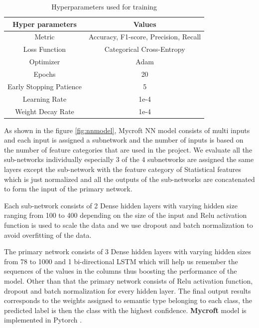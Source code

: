 \documentclass[12pt, a4paper]{report}
\theoremstyle{definition}
\numberwithin{equation}{chapter}
\numberwithin{figure}{chapter}
\numberwithin{table}{chapter}
\begin{document}
\begin{spacing}{1.5}
\begin{table}[H]
\centering
\begin{tabular}{|c| c|} 
\hline
\textbf{Hyper parameters} & \textbf{Values} \\
\hline
Metric & Accuracy, F1-score, Precision, Recall\\ 
Loss Function & Categorical Cross-Entropy\\ 
Optimizer & Adam\\ 
Epochs & 20\\ 
Early Stopping Patience & 5\\ 
Learning Rate & 1e-4\\ 
Weight Decay Rate & 1e-4\\ 
\hline
\end{tabular}
\caption{Hyperparameters used for training}
\label{table:2}
\end{table}

\setlength{\parindent}{0em}
As shown in the figure \ref{fig:nnmodel}, Mycroft NN model consists of multi inputs and each input is assigned a subnetwork and the number of inputs is based on the number of feature categories that are used in the project. We evaluate all the sub-networks individually especially 3 of the 4 subnetworks are assigned the same layers except the sub-network with the feature category of Statistical features which is just normalized and all the outputs of the sub-networks are concatenated to form the input of the primary network.
\par
\setlength{\parskip}{2.2em}
\setlength{\parindent}{0em}
Each sub-network consists of 2 Dense hidden layers with varying hidden size ranging from 100 to 400 depending on the size of the input and Relu activation function is used to scale the data and we use dropout and batch normalization to avoid overfitting of the data.
\par
\setlength{\parskip}{2.2em}
\setlength{\parindent}{0em}
The primary network consists of 3 Dense hidden layers with varying hidden sizes from 78 to 1000 and 1 bi-directional LSTM \cite{lstm} which will help us remember the sequences of the values in the columns thus boosting the performance of the model. Other than that the primary network consists of Relu activation function, dropout and batch normalization for every hidden layer. The final output results corresponds to the weights assigned to semantic type belonging to each class, the predicted label is then the class with the highest confidence. \textbf{Mycroft} model is implemented in Pytorch \cite{torch}.


\end{spacing}
\end{document}
